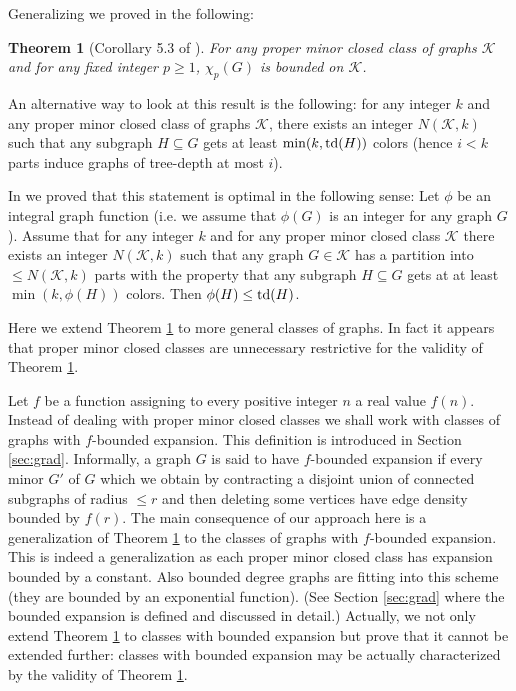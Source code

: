 \documentclass[a4paper]{amsart}
\newtheorem{theorem}{Theorem}[section]
\theoremstyle{definition}
\theoremstyle{remark}
\DeclareMathOperator\depth{{\rm td}}
\begin{document}
Generalizing \cite{2tw} we proved in \cite{Taxi_tdepth} the following:

\begin{theorem}[Corollary 5.3 of \cite{Taxi_tdepth}]
\label{mainold}
For any proper minor closed class of graphs $\mathcal K$ and for any
fixed integer $p\geq 1$, $\chi_p(G)$ is bounded on $\mathcal K$.
\end{theorem}
 

An alternative way to look at this result is the following: for any
integer $k$ and any proper minor closed class of graphs $\mathcal K$,
there exists an integer $N(\mathcal K,k)$ such that any subgraph
$H\subseteq G$ gets at least $\min(k,\depth(H))$ colors (hence $i<k$ parts
induce graphs of tree-depth at most $i$).

In\cite{Taxi_tdepth} we proved that  this  statement is optimal
in the following sense: Let $\phi$ be an integral graph function
(i.e. we assume that  $\phi(G)$ is an integer  for any graph
$G$). Assume that for  any integer $k$ and for
any proper minor
closed class $\mathcal K$ there exists an integer $N({\mathcal K},k)$
such that any graph $G \in \mathcal K$ has a partition into $\leq
N({\mathcal K},k)$ parts with the property that any subgraph
$H\subseteq G$
gets at at least $\min(k,\phi(H))$ colors. Then $\phi(H) 
\leq \depth(H)$. 

Here we
extend 
Theorem \ref{mainold} to more general classes of graphs. In fact it appears that proper minor closed classes are unnecessary restrictive for the validity of Theorem \ref{mainold}. 

Let $f$ be a function assigning to every positive integer $n$ a real value $f(n)$.
Instead of dealing with proper minor closed classes we shall work with classes of graphs with 
$f$-bounded expansion. This definition is introduced in Section \ref{sec:grad}. Informally, a graph $G$ is 
said to have $f$-bounded expansion if every minor $G'$ of $G$ which we obtain by 
contracting a disjoint union of connected subgraphs of radius $\leq r$
and then deleting some
vertices have edge density bounded by $f(r)$.
The main consequence of our approach here is a generalization of 
Theorem \ref{mainold}
to the classes of graphs with $f$-bounded expansion. This is indeed a generalization 
as each proper minor closed class has expansion bounded by a constant. Also
bounded degree graphs are fitting into this scheme (they are bounded by an exponential function).
(See Section \ref{sec:grad} where  the bounded expansion is defined and discussed
in detail.) Actually, we not only extend Theorem \ref{mainold} to
classes with bounded expansion but prove that it cannot be extended
further: classes with bounded expansion may be actually characterized
by the validity of Theorem \ref{mainold}.
 
\end{document}

